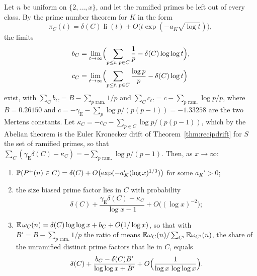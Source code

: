 \begin{theorem}\label{thm:pdmertens}
Let $n$ be uniform on $\{2,\dots,x\}$, and let the ramified primes be left out of every class. By the prime number theorem for $K$ in the form \cite{lagariasodlyzko1977}
\[
\pi_C(t)=\delta(C)\operatorname{li}(t)+O\bigl(t\exp(-a_K\sqrt{\log t})\bigr),
\]
the limits
\begin{align*}
b_C&=\lim_{t\to\infty}\Bigl(\sum_{p\le t,\,p\in C}\frac1p-\delta(C)\log\log t\Bigr),\\
c_C&=\lim_{t\to\infty}\Bigl(\sum_{p\le t,\,p\in C}\frac{\log p}p-\delta(C)\log t\Bigr)
\end{align*}
exist, with $\sum_Cb_C=B-\sum_{p\text{ ram.}}1/p$ and $\sum_Cc_C=c-\sum_{p\text{ ram.}}\log p/p$, where $B=0.26150$ and $c=-\gamma_{\mathrm E}-\sum_p\log p/(p(p-1))=-1.33258$ are the two Mertens constants. Let $\kappa_C=-c_C-\sum_{p\in C}\log p/(p(p-1))$, which by the Abelian theorem is the Euler Kronecker drift of Theorem~\ref{thm:recipdrift} for $S$ the set of ramified primes, so that $\sum_C(\gamma_{\mathrm E}\delta(C)-\kappa_C)=-\sum_{p\text{ ram.}}\log p/(p-1)$. Then, as $x\to\infty$:
\begin{enumerate}
\item[(i)] $\mathbb{P}(P^+(n)\in C)=\delta(C)+O\bigl(\exp(-a_K'(\log x)^{1/3})\bigr)$ for some $a_K'>0$;
\item[(ii)] the size biased prime factor lies in $C$ with probability
\[
\delta(C)+\frac{\gamma_{\mathrm E}\delta(C)-\kappa_C}{\log x-1}+O\bigl((\log x)^{-2}\bigr);
\]
\item[(iii)] $\mathbb{E}\,\omega_C(n)=\delta(C)\log\log x+b_C+O(1/\log x)$, so that with $B'=B-\sum_{p\text{ ram.}}1/p$ the ratio of means $\mathbb{E}\omega_C(n)/\sum_{C'}\mathbb{E}\omega_{C'}(n)$, the share of the unramified distinct prime factors that lie in $C$, equals
\[
\delta(C)+\frac{b_C-\delta(C)B'}{\log\log x+B'}+O\Bigl(\frac1{\log x\,\log\log x}\Bigr).
\]
\end{enumerate}
\end{theorem}

